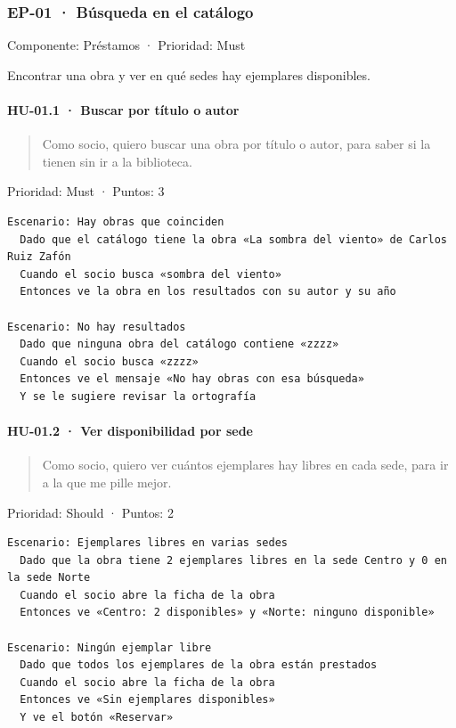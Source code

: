 \subsubsection*{EP-01 · Búsqueda en el catálogo}

Componente: Préstamos · Prioridad: Must

Encontrar una obra y ver en qué sedes hay ejemplares disponibles.

\paragraph*{HU-01.1 · Buscar por título o autor}

\begin{quote}
Como socio, quiero buscar una obra por título o autor, para saber si la tienen sin ir a la biblioteca.
\end{quote}

Prioridad: Must · Puntos: 3

\begin{Verbatim}[breaklines,fontsize=\small,frame=single,framerule=0.4pt,rulecolor=\color{black!25}]
Escenario: Hay obras que coinciden
  Dado que el catálogo tiene la obra «La sombra del viento» de Carlos Ruiz Zafón
  Cuando el socio busca «sombra del viento»
  Entonces ve la obra en los resultados con su autor y su año

Escenario: No hay resultados
  Dado que ninguna obra del catálogo contiene «zzzz»
  Cuando el socio busca «zzzz»
  Entonces ve el mensaje «No hay obras con esa búsqueda»
  Y se le sugiere revisar la ortografía
\end{Verbatim}

\paragraph*{HU-01.2 · Ver disponibilidad por sede}

\begin{quote}
Como socio, quiero ver cuántos ejemplares hay libres en cada sede, para ir a la que me pille mejor.
\end{quote}

Prioridad: Should · Puntos: 2

\begin{Verbatim}[breaklines,fontsize=\small,frame=single,framerule=0.4pt,rulecolor=\color{black!25}]
Escenario: Ejemplares libres en varias sedes
  Dado que la obra tiene 2 ejemplares libres en la sede Centro y 0 en la sede Norte
  Cuando el socio abre la ficha de la obra
  Entonces ve «Centro: 2 disponibles» y «Norte: ninguno disponible»

Escenario: Ningún ejemplar libre
  Dado que todos los ejemplares de la obra están prestados
  Cuando el socio abre la ficha de la obra
  Entonces ve «Sin ejemplares disponibles»
  Y ve el botón «Reservar»
\end{Verbatim}

